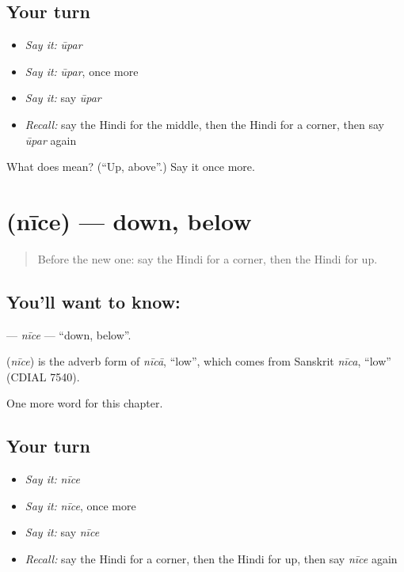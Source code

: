 \subsection*{Your turn}
\begin{itemize}
\raggedright
  \item \emph{Say it:} \emph{ūpar}
  \item \emph{Say it:} \emph{ūpar}, once more
  \item \emph{Say it:} say \emph{ūpar}
  \item \emph{Recall:} say the Hindi for the middle, then the Hindi for a corner, then say \emph{ūpar} again
\end{itemize}

\begin{tcolorbox}[breakable,colback=teal!4,colframe=teal!35!black,title={Before you move on}]
What does  mean? (\textquotedblleft{}Up, above\textquotedblright{}.) Say it once more.
\end{tcolorbox}
\section[\texorpdfstring{\hi{नीचे} (nīce)}{नीचे (nīce)}]{ (nīce) — down, below}

\label{lesson:HI-C235-nice}



\begin{quote}
Before the new one: say the Hindi for a corner, then the Hindi for up.
\end{quote}

\subsection*{You'll want to know: }
\textbf{} — \emph{nīce} — \textquotedblleft{}down, below\textquotedblright{}.

\begin{cousinweb}
\textbf{} (\emph{nīce}) is the adverb form of \emph{nīcā}, \textquotedblleft{}low\textquotedblright{}, which comes from Sanskrit \emph{nīca}, \textquotedblleft{}low\textquotedblright{} (CDIAL 7540).
\end{cousinweb}

\begin{grammarlens}[title={What you've built}]
One more word for this chapter.
\end{grammarlens}

\subsection*{Your turn}
\begin{itemize}
\raggedright
  \item \emph{Say it:} \emph{nīce}
  \item \emph{Say it:} \emph{nīce}, once more
  \item \emph{Say it:} say \emph{nīce}
  \item \emph{Recall:} say the Hindi for a corner, then the Hindi for up, then say \emph{nīce} again
\end{itemize}

